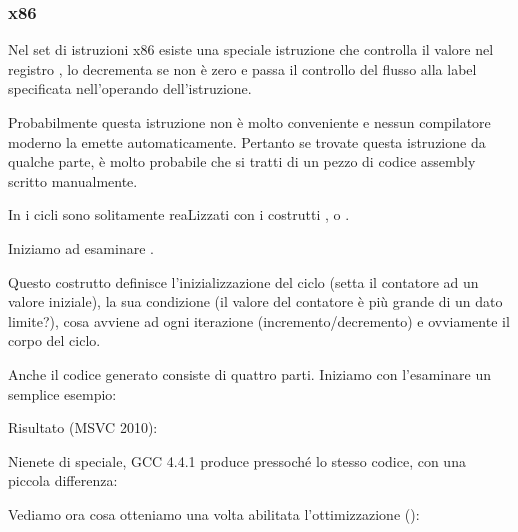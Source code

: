 \subsubsection{x86}


Nel set di istruzioni x86 esiste una speciale istruzione \LOOP che controlla il valore nel registro \ECX, lo decrementa se non è zero
e passa il controllo del flusso alla label specificata nell'operando dell'istruzione.

Probabilmente questa istruzione non è molto conveniente e nessun compilatore moderno la emette automaticamente. Pertanto se trovate questa
istruzione da qualche parte, è molto probabile che si tratti di un pezzo di codice assembly scritto manualmente.


\par

In \CCpp i cicli sono solitamente reaLizzati con i costrutti ,  o .

Iniziamo ad esaminare .

Questo costrutto definisce l'inizializzazione del ciclo (setta il contatore ad un valore iniziale),
la sua condizione (il valore del contatore è più grande di un dato limite?),
cosa avviene ad ogni iterazione (\gls{incremento}/\gls{decremento})
e ovviamente il corpo del ciclo.



Anche il codice generato consiste di quattro parti. Iniziamo con l'esaminare un semplice esempio:



Risultato (MSVC 2010):



Nienete di speciale, GCC 4.4.1 produce pressoché lo stesso codice, con una piccola differenza:



Vediamo ora cosa otteniamo una volta abilitata l'ottimizzazione (\TT{\Ox}):



